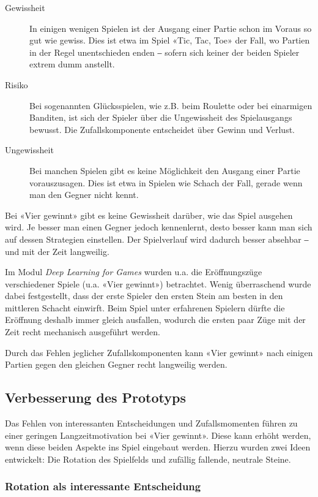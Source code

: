 \documentclass[a4paper,11pt,hidelinks]{scrartcl}
\begin{document}
\begin{description}
    \item[Gewissheit] In einigen wenigen Spielen ist der Ausgang einer Partie schon im Voraus so gut wie gewiss. Dies ist etwa im Spiel «Tic, Tac, Toe» der Fall, wo Partien in der Regel unentschieden enden ‒ sofern sich keiner der beiden Spieler extrem dumm anstellt.
    \item[Risiko] Bei sogenannten Glücksspielen, wie z.B. beim Roulette oder bei einarmigen Banditen, ist sich der Spieler über die Ungewissheit des Spielausgangs bewusst. Die Zufallskomponente entscheidet über Gewinn und Verlust.
    \item[Ungewissheit] Bei manchen Spielen gibt es keine Möglichkeit den Ausgang einer Partie vorauszusagen. Dies ist etwa in Spielen wie Schach der Fall, gerade wenn man den Gegner nicht kennt.
\end{description}

Bei «Vier gewinnt» gibt es keine Gewissheit darüber, wie das Spiel ausgehen wird. Je besser man einen Gegner jedoch kennenlernt, desto besser kann man sich auf dessen Strategien einstellen. Der Spielverlauf wird dadurch besser absehbar ‒ und mit der Zeit langweilig.

Im Modul \textit{Deep Learning for Games} wurden u.a. die Eröffnungszüge verschiedener Spiele (u.a. «Vier gewinnt») betrachtet. Wenig überraschend wurde dabei festgestellt, dass der erste Spieler den ersten Stein am besten in den mittleren Schacht einwirft. Beim Spiel unter erfahrenen Spielern dürfte die Eröffnung deshalb immer gleich ausfallen, wodurch die ersten paar Züge mit der Zeit recht mechanisch ausgeführt werden.

Durch das Fehlen jeglicher Zufallskomponenten kann «Vier gewinnt» nach einigen Partien gegen den gleichen Gegner recht langweilig werden.

\subsection{Verbesserung des Prototyps}

Das Fehlen von interessanten Entscheidungen und Zufallsmomenten führen zu einer geringen Langzeitmotivation bei «Vier gewinnt». Diese kann erhöht werden, wenn diese beiden Aspekte ins Spiel eingebaut werden. Hierzu wurden zwei Ideen entwickelt: Die Rotation des Spielfelds und zufällig fallende, neutrale Steine.

\subsubsection{Rotation als interessante Entscheidung}
\end{document}
